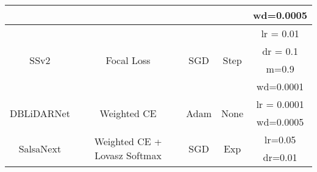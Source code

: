 \documentclass{article}
\begin{document}
\begin{table}[htb]
\begin{adjustbox}{max width=\textwidth}
\begin{tabular}{ccccc}
\multicolumn{1}{|c|}{}                            & \multicolumn{1}{c|}{}                                              & \multicolumn{1}{c|}{}                         & \multicolumn{1}{c|}{}                      & \multicolumn{1}{c|}{wd=0.0005}      \\ \hline
\multicolumn{1}{|c|}{\multirow{4}{*}{SSv2 \cite{wu2019squeezesegv2}}}       & \multicolumn{1}{c|}{\multirow{4}{*}{Focal Loss}}                   & \multicolumn{1}{c|}{\multirow{4}{*}{SGD}}     & \multicolumn{1}{c|}{\multirow{4}{*}{Step}} & \multicolumn{1}{c|}{lr = 0.01}      \\ \cline{5-5} 
\multicolumn{1}{|c|}{}                            & \multicolumn{1}{c|}{}                                              & \multicolumn{1}{c|}{}                         & \multicolumn{1}{c|}{}                      & \multicolumn{1}{c|}{dr = 0.1}       \\ \cline{5-5} 
\multicolumn{1}{|c|}{}                            & \multicolumn{1}{c|}{}                                              & \multicolumn{1}{c|}{}                         & \multicolumn{1}{c|}{}                      & \multicolumn{1}{c|}{m=0.9}          \\ \cline{5-5} 
\multicolumn{1}{|c|}{}                            & \multicolumn{1}{c|}{}                                              & \multicolumn{1}{c|}{}                         & \multicolumn{1}{c|}{}                      & \multicolumn{1}{c|}{wd=0.0001}      \\ \hline
\multicolumn{1}{|c|}{\multirow{2}{*}{DBLiDARNet \cite{dewan2019deeptemporalseg}}} & \multicolumn{1}{c|}{\multirow{2}{*}{Weighted CE}}                  & \multicolumn{1}{c|}{\multirow{2}{*}{Adam}}    & \multicolumn{1}{c|}{\multirow{2}{*}{None}} & \multicolumn{1}{c|}{lr = 0.0001}    \\ \cline{5-5} 
\multicolumn{1}{|c|}{}                            & \multicolumn{1}{c|}{}                                              & \multicolumn{1}{c|}{}                         & \multicolumn{1}{c|}{}                      & \multicolumn{1}{c|}{wd=0.0005}      \\ \hline
\multicolumn{1}{|c|}{\multirow{4}{*}{SalsaNext \cite{cortinhal2020salsanext}}}  & \multicolumn{1}{c|}{\multirow{4}{*}{Weighted CE + Lovasz Softmax}} & \multicolumn{1}{c|}{\multirow{4}{*}{SGD}}     & \multicolumn{1}{c|}{\multirow{4}{*}{Exp}}  & \multicolumn{1}{c|}{lr=0.05}        \\ \cline{5-5} 
\multicolumn{1}{|c|}{}                            & \multicolumn{1}{c|}{}                                              & \multicolumn{1}{c|}{}                         & \multicolumn{1}{c|}{}                      & \multicolumn{1}{c|}{dr=0.01}        \\ \cline{5-5} 

\end{tabular}
\end{adjustbox}
\end{table}
\end{document}
